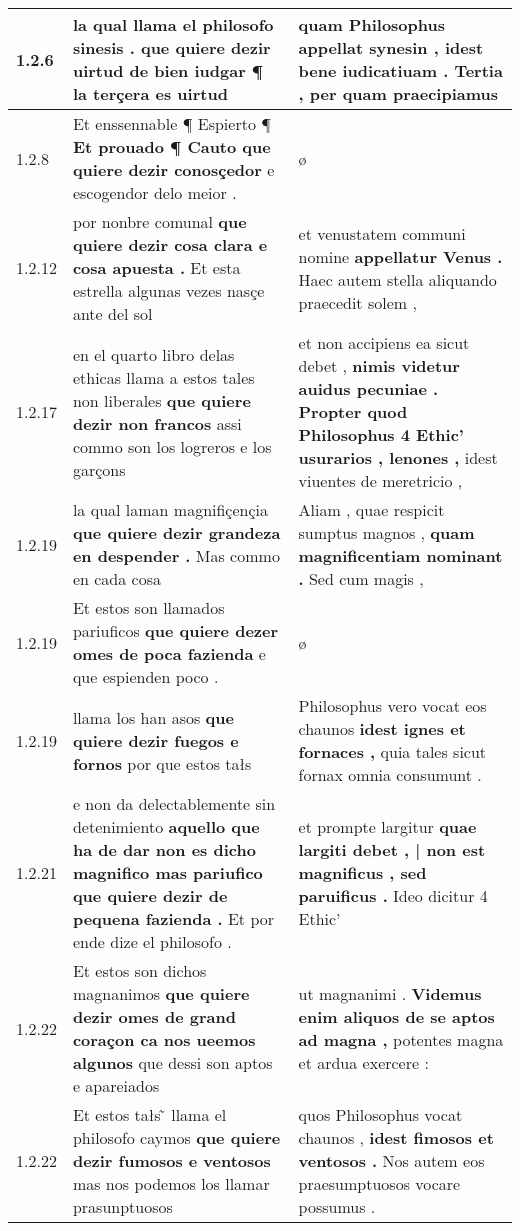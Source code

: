 \begin{tabular}{|p{1cm}|p{6.5cm}|p{6.5cm}|}
1.2.6 & la qual llama el philosofo sinesis . \textbf{ que quiere dezir uirtud de bien iudgar } ¶ la terçera es uirtud & quam Philosophus appellat synesin , \textbf{ idest bene iudicatiuam . } Tertia , per quam praecipiamus \\\hline
1.2.8 & Et enssennable ¶ Espierto ¶ \textbf{ Et prouado ¶ Cauto que quiere dezir conosçedor } e escogendor delo meior . & ø \\\hline
1.2.12 & por nonbre comunal \textbf{ que quiere dezir cosa clara e cosa apuesta . } Et esta estrella algunas vezes nasçe ante del sol & et venustatem communi nomine \textbf{ appellatur Venus . } Haec autem stella aliquando praecedit solem , \\\hline
1.2.17 & en el quarto libro delas ethicas llama a estos tales non liberales \textbf{ que quiere dezir non francos } assi commo son los logreros e los garçons & et non accipiens ea sicut debet , \textbf{ nimis videtur auidus pecuniae . Propter quod Philosophus 4 Ethic’ usurarios , lenones , } idest viuentes de meretricio , \\\hline
1.2.19 & la qual laman magnifiçençia \textbf{ que quiere dezir grandeza en despender . } Mas commo en cada cosa & Aliam , quae respicit sumptus magnos , \textbf{ quam magnificentiam nominant . } Sed cum magis , \\\hline
1.2.19 & Et estos son llamados pariuficos \textbf{ que quiere dezer omes de poca fazienda } e que espienden poco . & ø \\\hline
1.2.19 & llama los han asos \textbf{ que quiere dezir fuegos e fornos } por que estos tałs & Philosophus vero vocat eos chaunos \textbf{ idest ignes et fornaces , } quia tales sicut fornax omnia consumunt . \\\hline
1.2.21 & e non da delectablemente sin detenimiento \textbf{ aquello que ha de dar non es dicho magnifico mas pariufico que quiere dezir de pequena fazienda . } Et por ende dize el philosofo . & et prompte largitur \textbf{ quae largiti debet , | non est magnificus , sed paruificus . } Ideo dicitur 4 Ethic’ \\\hline
1.2.22 & Et estos son dichos magnanimos \textbf{ que quiere dezir omes de grand coraçon ca nos ueemos algunos } que dessi son aptos e apareiados & ut magnanimi . \textbf{ Videmus enim aliquos de se aptos ad magna , } potentes magna et ardua exercere : \\\hline
1.2.22 & Et estos tałs ̃ llama el philosofo caymos \textbf{ que quiere dezir fumosos e ventosos } mas nos podemos los llamar prasunptuosos & quos Philosophus vocat chaunos , \textbf{ idest fimosos et ventosos . } Nos autem eos praesumptuosos vocare possumus . \\\hline

\end{tabular}
